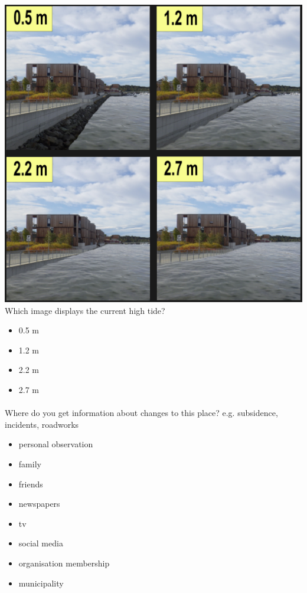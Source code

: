 \includegraphics[width=1\textwidth]{fig_appendix/grillstad 2022 q.png}
Which image displays the current high tide?
\begin{itemize}
    \item 0.5 m
    \item 1.2 m
    \item 2.2 m
    \item 2.7 m
   \end{itemize}
\paragraph{}

Where do you get information about changes to this place?
e.g. subsidence, incidents, roadworks
\begin{itemize}
    \item personal observation
    \item family
    \item friends
    \item newspapers
    \item tv
    \item social media
    \item organisation membership
    \item municipality
\end{itemize}
\paragraph{}

